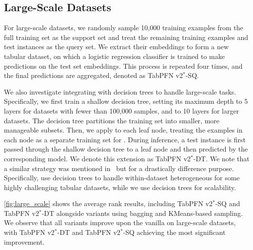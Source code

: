 \subsection{Large-Scale Datasets}
For large-scale datasets, we randomly sample 10,000 training examples from the full training set as the support set and treat the remaining training examples and test instances as the query set. We extract their embeddings to form a new tabular dataset, on which a logistic regression classifier is trained to make predictions on the test set embeddings. This process is repeated four times, and the final predictions are aggregated, denoted as TabPFN v2$^*$-SQ.

We also investigate integrating \ours with decision trees to handle large-scale tasks. Specifically, we first train a shallow decision tree, setting its maximum depth to 5 layers for datasets with fewer than 100,000 samples, and to 10 layers for larger datasets. The decision tree partitions the training set into smaller, more manageable subsets. Then, we apply \ours to each leaf node, treating the examples in each node as a separate training set for \ours. During inference, a test instance is first passed through the shallow decision tree to a leaf node and then predicted by the corresponding \ours model. We denote this extension as TabPFN v2$^*$-DT. 
We note that a similar strategy was mentioned in~\citet{hollmann2025TabPFNv2} but for a drastically difference purpose. Specifically, \citet{hollmann2025TabPFNv2} use decision trees to handle within-dataset heterogeneous for some highly challenging tabular datasets, while we use decision trees for scalability.

\autoref{fig:large_scale} shows the average rank results, including TabPFN v2$^*$-SQ and TabPFN v2$^*$-DT alongside variants using bagging and KMeans-based sampling. We observe that all variants improve upon the vanilla \ours on large-scale datasets, with TabPFN v2$^*$-DT and TabPFN v2$^*$-SQ achieving the most significant improvement.